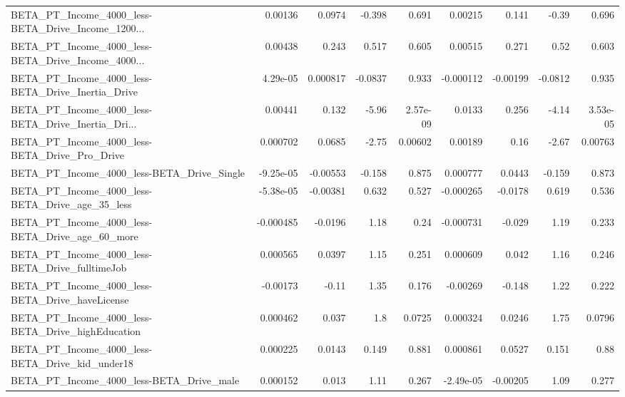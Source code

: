 \begin{tabular}{lrrrrrrrr}
BETA\_PT\_Income\_4000\_less-BETA\_Drive\_Income\_1200... &     0.00136 &       0.0974 &   -0.398 &    0.691 &    0.00215 &       0.141 &        -0.39 &         0.696 \\
BETA\_PT\_Income\_4000\_less-BETA\_Drive\_Income\_4000... &     0.00438 &        0.243 &    0.517 &    0.605 &    0.00515 &       0.271 &         0.52 &         0.603 \\
BETA\_PT\_Income\_4000\_less-BETA\_Drive\_Inertia\_Drive  &    4.29e-05 &     0.000817 &  -0.0837 &    0.933 &  -0.000112 &    -0.00199 &      -0.0812 &         0.935 \\
BETA\_PT\_Income\_4000\_less-BETA\_Drive\_Inertia\_Dri... &     0.00441 &        0.132 &    -5.96 & 2.57e-09 &     0.0133 &       0.256 &        -4.14 &      3.53e-05 \\
BETA\_PT\_Income\_4000\_less-BETA\_Drive\_Pro\_Drive      &    0.000702 &       0.0685 &    -2.75 &  0.00602 &    0.00189 &        0.16 &        -2.67 &       0.00763 \\
BETA\_PT\_Income\_4000\_less-BETA\_Drive\_Single         &   -9.25e-05 &     -0.00553 &   -0.158 &    0.875 &   0.000777 &      0.0443 &       -0.159 &         0.873 \\
BETA\_PT\_Income\_4000\_less-BETA\_Drive\_age\_35\_less    &   -5.38e-05 &     -0.00381 &    0.632 &    0.527 &  -0.000265 &     -0.0178 &        0.619 &         0.536 \\
BETA\_PT\_Income\_4000\_less-BETA\_Drive\_age\_60\_more    &   -0.000485 &      -0.0196 &     1.18 &     0.24 &  -0.000731 &      -0.029 &         1.19 &         0.233 \\
BETA\_PT\_Income\_4000\_less-BETA\_Drive\_fulltimeJob    &    0.000565 &       0.0397 &     1.15 &    0.251 &   0.000609 &       0.042 &         1.16 &         0.246 \\
BETA\_PT\_Income\_4000\_less-BETA\_Drive\_haveLicense    &    -0.00173 &        -0.11 &     1.35 &    0.176 &   -0.00269 &      -0.148 &         1.22 &         0.222 \\
BETA\_PT\_Income\_4000\_less-BETA\_Drive\_highEducation  &    0.000462 &        0.037 &      1.8 &   0.0725 &   0.000324 &      0.0246 &         1.75 &        0.0796 \\
BETA\_PT\_Income\_4000\_less-BETA\_Drive\_kid\_under18    &    0.000225 &       0.0143 &    0.149 &    0.881 &   0.000861 &      0.0527 &        0.151 &          0.88 \\
BETA\_PT\_Income\_4000\_less-BETA\_Drive\_male           &    0.000152 &        0.013 &     1.11 &    0.267 &  -2.49e-05 &    -0.00205 &         1.09 &         0.277 \\

\end{tabular}
